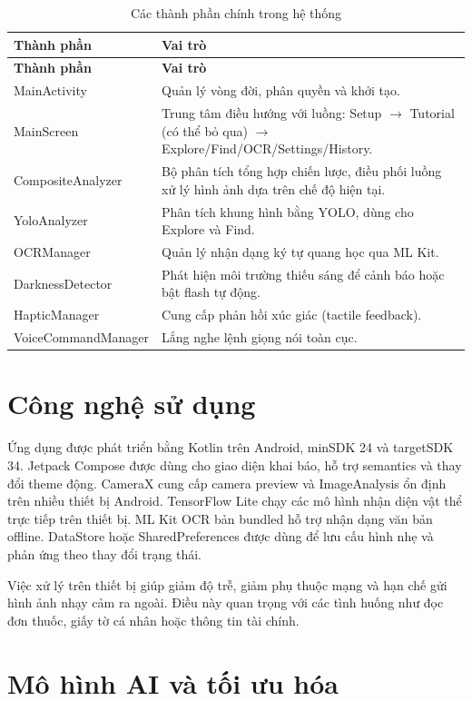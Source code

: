 \documentclass[a4paper,13pt]{report}
\begin{document}
\begin{longtable}{p{}p{}}
\caption{Các thành phần chính trong hệ thống}\\
\toprule
\textbf{Thành phần} & \textbf{Vai trò} \\
\midrule
\endfirsthead
\toprule
\textbf{Thành phần} & \textbf{Vai trò} \\
\midrule
\endhead
MainActivity & Quản lý vòng đời, phân quyền và khởi tạo. \\ \hline
MainScreen & Trung tâm điều hướng với luồng: Setup $\rightarrow$ Tutorial (có thể bỏ qua) $\rightarrow$ Explore/Find/OCR/Settings/History. \\ \hline
CompositeAnalyzer & Bộ phân tích tổng hợp chiến lược, điều phối luồng xử lý hình ảnh dựa trên chế độ hiện tại. \\ \hline
YoloAnalyzer & Phân tích khung hình bằng YOLO, dùng cho Explore và Find. \\ \hline
OCRManager & Quản lý nhận dạng ký tự quang học qua ML Kit. \\ \hline
DarknessDetector & Phát hiện môi trường thiếu sáng để cảnh báo hoặc bật flash tự động. \\ \hline
HapticManager & Cung cấp phản hồi xúc giác (tactile feedback). \\ \hline
VoiceCommandManager & Lắng nghe lệnh giọng nói toàn cục. \\
\bottomrule
\end{longtable}

\section{Công nghệ sử dụng}

Ứng dụng được phát triển bằng Kotlin trên Android, minSDK 24 và targetSDK 34. Jetpack Compose được dùng cho giao diện khai báo, hỗ trợ semantics và thay đổi theme động. CameraX cung cấp camera preview và ImageAnalysis ổn định trên nhiều thiết bị Android. TensorFlow Lite chạy các mô hình nhận diện vật thể trực tiếp trên thiết bị. ML Kit OCR bản bundled hỗ trợ nhận dạng văn bản offline. DataStore hoặc SharedPreferences được dùng để lưu cấu hình nhẹ và phản ứng theo thay đổi trạng thái.

Việc xử lý trên thiết bị giúp giảm độ trễ, giảm phụ thuộc mạng và hạn chế gửi hình ảnh nhạy cảm ra ngoài. Điều này quan trọng với các tình huống như đọc đơn thuốc, giấy tờ cá nhân hoặc thông tin tài chính.

\section{Mô hình AI và tối ưu hóa}
\end{document}
